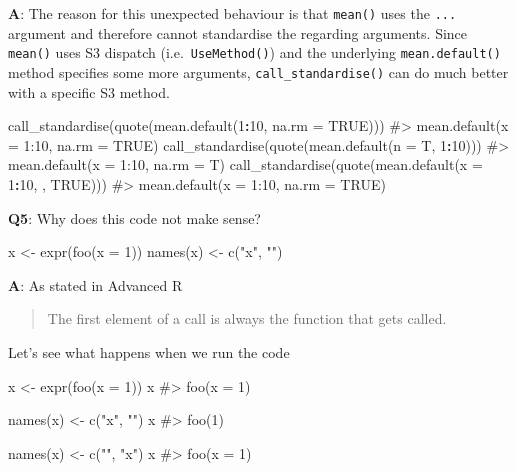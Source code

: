 \documentclass[
]{krantz}
\makeatletter
\newenvironment{Shaded}{\begin{snugshade}}{\end{snugshade}}
\newcommand{\CommentTok}[1]{\textcolor[rgb]{0.56,0.35,0.01}{\textit{#1}}}
\newcommand{\DataTypeTok}[1]{\textcolor[rgb]{0.13,0.29,0.53}{#1}}
\newcommand{\DecValTok}[1]{\textcolor[rgb]{0.00,0.00,0.81}{#1}}
\newcommand{\KeywordTok}[1]{\textcolor[rgb]{0.13,0.29,0.53}{\textbf{#1}}}
\newcommand{\NormalTok}[1]{#1}
\newcommand{\OperatorTok}[1]{\textcolor[rgb]{0.81,0.36,0.00}{\textbf{#1}}}
\newcommand{\OtherTok}[1]{\textcolor[rgb]{0.56,0.35,0.01}{#1}}
\newcommand{\StringTok}[1]{\textcolor[rgb]{0.31,0.60,0.02}{#1}}
\newenvironment{kframe}{%
\medskip{}
\setlength{\fboxsep}{.8em}
 \def\at@end@of@kframe{}%
 \ifinner\ifhmode%
  \def\at@end@of@kframe{\end{minipage}}%
  \begin{minipage}{\columnwidth}%
 \fi\fi%
 \def\FrameCommand##1{\hskip\@totalleftmargin \hskip-\fboxsep
 \colorbox{shadecolor}{##1}\hskip-\fboxsep
     \hskip-\linewidth \hskip-\@totalleftmargin \hskip\columnwidth}%
 \MakeFramed {\advance\hsize-\width
   \@totalleftmargin\z@ \linewidth\hsize
   \@setminipage}}%
 {\par\unskip\endMakeFramed%
 \at@end@of@kframe}
\renewenvironment{Shaded}{\begin{kframe}}{\end{kframe}}
\renewcommand{\KeywordTok} [1]{\textcolor[rgb]{0.00,0.44,0.13}{{#1}}}
\renewcommand{\DataTypeTok}[1]{\textcolor[rgb]{0.56,0.13,0.00}{{#1}}}
\renewcommand{\DecValTok}  [1]{\textcolor[rgb]{0.25,0.63,0.44}{{#1}}}
\renewcommand{\StringTok}  [1]{\textcolor[rgb]{0.25,0.44,0.63}{{#1}}}
\renewcommand{\CommentTok} [1]{\textcolor[rgb]{0.38,0.63,0.69}{{#1}}}
\renewcommand{\OtherTok}   [1]{\textcolor[rgb]{0.00,0.44,0.13}{{#1}}}
\renewcommand{\NormalTok}  [1]{{#1}}
\makeatother
\begin{document}
\textbf{{A}}: The reason for this unexpected behaviour is that \texttt{mean()} uses the \texttt{...} argument and therefore cannot standardise the regarding arguments. Since \texttt{mean()} uses S3 dispatch (i.e.~\texttt{UseMethod()}) and the underlying \texttt{mean.default()} method specifies some more arguments, \texttt{call\_standardise()} can do much better with a specific S3 method.

\begin{Shaded}
\begin{Highlighting}[]
\KeywordTok{call_standardise}\NormalTok{(}\KeywordTok{quote}\NormalTok{(}\KeywordTok{mean.default}\NormalTok{(}\DecValTok{1}\OperatorTok{:}\DecValTok{10}\NormalTok{, }\DataTypeTok{na.rm =} \OtherTok{TRUE}\NormalTok{)))}
\CommentTok{#> mean.default(x = 1:10, na.rm = TRUE)}
\KeywordTok{call_standardise}\NormalTok{(}\KeywordTok{quote}\NormalTok{(}\KeywordTok{mean.default}\NormalTok{(}\DataTypeTok{n =}\NormalTok{ T, }\DecValTok{1}\OperatorTok{:}\DecValTok{10}\NormalTok{)))}
\CommentTok{#> mean.default(x = 1:10, na.rm = T)}
\KeywordTok{call_standardise}\NormalTok{(}\KeywordTok{quote}\NormalTok{(}\KeywordTok{mean.default}\NormalTok{(}\DataTypeTok{x =} \DecValTok{1}\OperatorTok{:}\DecValTok{10}\NormalTok{, , }\OtherTok{TRUE}\NormalTok{)))}
\CommentTok{#> mean.default(x = 1:10, na.rm = TRUE)}
\end{Highlighting}
\end{Shaded}

\textbf{{Q5}}: Why does this code not make sense?

\begin{Shaded}
\begin{Highlighting}[]
\NormalTok{x <-}\StringTok{ }\KeywordTok{expr}\NormalTok{(}\KeywordTok{foo}\NormalTok{(}\DataTypeTok{x =} \DecValTok{1}\NormalTok{))}
\KeywordTok{names}\NormalTok{(x) <-}\StringTok{ }\KeywordTok{c}\NormalTok{(}\StringTok{"x"}\NormalTok{, }\StringTok{""}\NormalTok{)}
\end{Highlighting}
\end{Shaded}

\textbf{{A}}: As stated in Advanced R

\begin{quote}
The first element of a call is always the function that gets called.
\end{quote}

Let's see what happens when we run the code

\begin{Shaded}
\begin{Highlighting}[]
\NormalTok{x <-}\StringTok{ }\KeywordTok{expr}\NormalTok{(}\KeywordTok{foo}\NormalTok{(}\DataTypeTok{x =} \DecValTok{1}\NormalTok{))}
\NormalTok{x}
\CommentTok{#> foo(x = 1)}

\KeywordTok{names}\NormalTok{(x) <-}\StringTok{ }\KeywordTok{c}\NormalTok{(}\StringTok{"x"}\NormalTok{, }\StringTok{""}\NormalTok{)}
\NormalTok{x}
\CommentTok{#> foo(1)}

\KeywordTok{names}\NormalTok{(x) <-}\StringTok{ }\KeywordTok{c}\NormalTok{(}\StringTok{""}\NormalTok{, }\StringTok{"x"}\NormalTok{)}
\NormalTok{x}
\CommentTok{#> foo(x = 1)}
\end{Highlighting}
\end{Shaded}
\end{document}
